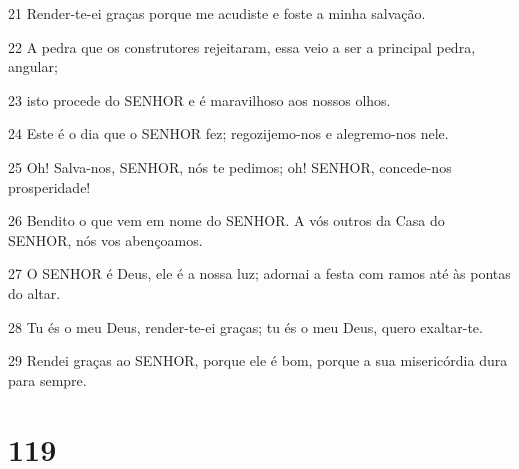\par 21 Render-te-ei graças porque me acudiste e foste a minha salvação.
\par 22 A pedra que os construtores rejeitaram, essa veio a ser a principal pedra, angular;
\par 23 isto procede do SENHOR e é maravilhoso aos nossos olhos.
\par 24 Este é o dia que o SENHOR fez; regozijemo-nos e alegremo-nos nele.
\par 25 Oh! Salva-nos, SENHOR, nós te pedimos; oh! SENHOR, concede-nos prosperidade!
\par 26 Bendito o que vem em nome do SENHOR. A vós outros da Casa do SENHOR, nós vos abençoamos.
\par 27 O SENHOR é Deus, ele é a nossa luz; adornai a festa com ramos até às pontas do altar.
\par 28 Tu és o meu Deus, render-te-ei graças; tu és o meu Deus, quero exaltar-te.
\par 29 Rendei graças ao SENHOR, porque ele é bom, porque a sua misericórdia dura para sempre.

\chapter{119}

